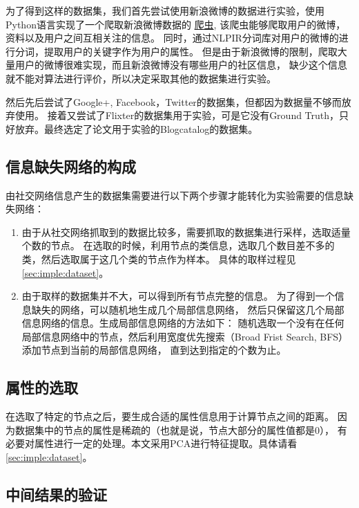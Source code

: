 为了得到这样的数据集，我们首先尝试使用新浪微博的数据进行实验，使用Python语言实现了一个爬取新浪微博数据的
\href{https://github.com/chouqin/weibo-crawler}{爬虫},
该爬虫能够爬取用户的微博，资料以及用户之间互相关注的信息。
同时，通过NLPIR分词库对用户的微博的进行分词，提取用户的关键字作为用户的属性。
但是由于新浪微博的限制，爬取大量用户的微博很难实现，而且新浪微博没有哪些用户的社区信息，
缺少这个信息就不能对算法进行评价，所以决定采取其他的数据集进行实验。

然后先后尝试了Google+, Facebook，Twitter的数据集，但都因为数据量不够而放弃使用。
接着又尝试了Flixter的数据集用于实验，可是它没有Ground Truth，只好放弃。最终选定了论文用于实验的Blogcatalog的数据集。

\subsection{信息缺失网络的构成}

由社交网络信息产生的数据集需要进行以下两个步骤才能转化为实验需要的信息缺失网络：

\begin{enumerate}
\item 由于从社交网络抓取到的数据比较多，需要抓取的数据集进行采样，选取适量个数的节点。
在选取的时候，利用节点的类信息，选取几个数目差不多的类，然后选取属于这几个类的节点作为样本。
具体的取样过程见\ref{sec:imple:dataset}。
\item 由于取样的数据集并不大，可以得到所有节点完整的信息。
为了得到一个信息缺失的网络，可以随机地生成几个局部信息网络，
然后只保留这几个局部信息网络的信息。生成局部信息网络的方法如下：
随机选取一个没有在任何局部信息网络中的节点，然后利用宽度优先搜索（Broad Frist Search, BFS）添加节点到当前的局部信息网络，
直到达到指定的个数为止。
\end{enumerate}


\subsection{属性的选取}

在选取了特定的节点之后，要生成合适的属性信息用于计算节点之间的距离。
因为数据集中的节点的属性是稀疏的（也就是说，节点大部分的属性值都是0），
有必要对属性进行一定的处理。本文采用PCA进行特征提取。具体请看\ref{sec:imple:dataset}。

\subsection{中间结果的验证}

